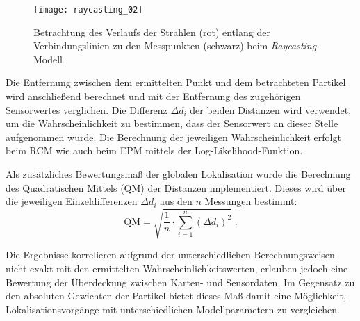 \begin{figure}[!ht]
	\begin{center}
		\texttt{[image: raycasting\_02]}
		\caption{Betrachtung des Verlaufs der Strahlen (rot) entlang der Verbindungslinien zu den Messpunkten (schwarz) beim \textit{Raycasting}-Modell}
		\label{fig.raycast}
	\end{center}
\end{figure}

\prever{
}
Die Entfernung zwischen dem ermittelten Punkt und dem betrachteten Partikel wird anschließend berechnet und mit der Entfernung des zugehörigen Sensorwertes verglichen. Die Differenz ${\Delta d}_i$ der beiden Distanzen wird verwendet, um die Wahrscheinlichkeit zu bestimmen, dass der Sensorwert an dieser Stelle aufgenommen wurde. Die Berechnung der jeweiligen Wahrscheinlichkeit erfolgt beim RCM wie auch beim EPM mittels der Log-Likelihood-Funktion.\\

\vspace{13mm}

Als zusätzliches Bewertungsmaß der globalen Lokalisation wurde die Berechnung des Quadratischen Mittels (QM) der Distanzen implementiert. Dieses wird über die jeweiligen Einzeldifferenzen ${\Delta d}_i$ aus den $n$ Messungen bestimmt:
%
\begin{equation}
\mathrm{QM} = \sqrt{\frac{1}{n} \cdot \sum_{i=1}^n{({\Delta d}_i)^2}} \; \text{.}
\end{equation}


Die Ergebnisse korrelieren aufgrund der unterschiedlichen Berechnungsweisen nicht exakt mit den ermittelten Wahrscheinlichkeitswerten, erlauben jedoch eine Bewertung der Überdeckung zwischen Karten- und Sensordaten. Im Gegensatz zu den absoluten Gewichten der Partikel bietet dieses Maß damit eine Möglichkeit, Lokalisationsvorgänge mit unterschiedlichen Modellparametern zu vergleichen.

\prever{
}

